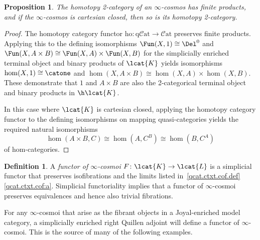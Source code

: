 \documentclass[12pt,reqno]{amsart}
\theoremstyle{plain}
\newtheorem{prop}[thm]{Proposition}
\theoremstyle{definition}
\newtheorem{defn}[thm]{Definition}
\theoremstyle{remark}
\numberwithin{equation}{subsection}
\renewcommand{\Cat}{\mathcal{C}\mathrm{at}}
\renewcommand{\qCat}{\mathrm{q}\mathcal{C}\mathrm{at}}
\renewcommand{\ho}{\mathrm{ho}}
\begin{document}
\begin{prop}\label{prop:cartesian-closure}
The homotopy 2-category of an $\infty$-cosmos has finite products, and if the $\infty$-cosmos is cartesian closed, then so is its homotopy 2-category.
\end{prop}
\begin{proof}
The homotopy category functor $\ho \colon \qCat \to \Cat$ preserves finite products. Applying this to the  defining isomorphisms $\Fun(X,1)\cong \Del^0$ and $\Fun(X, A\times B)\cong\Fun(X,A)\times\Fun(X,B)$ for the simplicially enriched terminal object and binary products of $\lcat{K}$ yields isomorphisms $\hom(X,1)\cong \catone$ and $\hom(X, A\times B)\cong\hom(X,A)\times\hom(X,B)$. These demonstrate that $1$ and $A\times B$ are also the 2-categorical terminal object and binary products in $\h\lcat{K}$.

In this case where $\lcat{K}$ is cartesian closed, applying the homotopy category functor to the defining isomorphisms on mapping quasi-categories yields the required natural isomorphisms
\[ \hom(A \times B, C) \cong \hom(A,C^B) \cong \hom(B,C^A)\] of hom-categories.
\end{proof}


\begin{defn}\label{defn:qcat-ctxt-functor} A \emph{functor of $\infty$-cosmoi} $F \colon \lcat{K} \to \lcat{L}$ is a simplicial functor that preserves isofibrations and the limits listed  in~\ref{qcat.ctxt.cof.def}\ref{qcat.ctxt.cof:a}. Simplicial functoriality implies that a functor of $\infty$-cosmoi  preserves equivalences and hence also trivial fibrations. 
\end{defn}

For any $\infty$-cosmoi that arise as the fibrant objects in a Joyal-enriched model category, a simplicially enriched right Quillen adjoint will define a functor of $\infty$-cosmoi. This is the source of many of the following examples.
\end{document}
